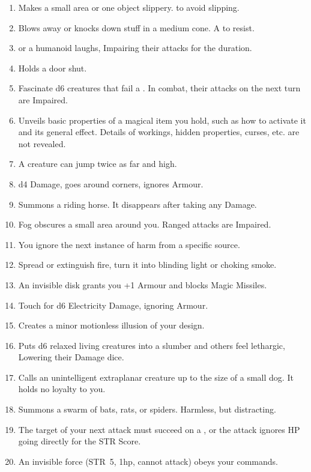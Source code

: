 \documentclass[itdr/core]{subfiles}
\begin{document}
\begin{enumerate}
	\vfill
	\break
	
	\item {} Makes a small area or one object slippery.  to avoid slipping.
	\item {} Blows away or knocks down stuff in a medium cone. A  to resist.
	\item {}  or a humanoid laughs, Impairing their attacks for the duration.
	\item {} Holds a door shut.
	\item {} Fascinate d6 creatures that fail a . In combat, their attacks on the next turn are Impaired.
	\item {} Unveils basic properties of a magical item you hold, such as how to activate it and its general effect. Details of workings, hidden properties, curses, etc. are not revealed.
	\item {} A creature can jump twice as far and high.
	\item {} d4 Damage, goes around corners, ignores Armour.
	\item {} Summons a riding horse. It disappears after taking any Damage.
	\item {} Fog obscures a small area around you. Ranged attacks are Impaired.
	\item {} You ignore the next instance of harm from a specific source.
	\item {} Spread or extinguish fire, turn it into blinding light or choking smoke.
	\item {} An invisible disk grants you +1 Armour and blocks Magic Missiles.
	\item {} Touch for d6 Electricity \mbox{Damage}, ignoring Armour.
	\item {} Creates a minor motionless \mbox{illusion} of your design.
	\item {} Puts d6 relaxed living creatures into a slumber and others feel lethargic, Lowering their \mbox{Damage} dice.
	\item {} Calls an unintelligent extraplanar creature up to the size of a small dog. It holds no loyalty to you.
	\item {} Summons a swarm of bats, rats, or spiders. Harmless, but distracting.
	\item {} The target of your next attack must succeed on a , or the attack ignores HP going directly for the STR Score.
	\item {} An invisible force (STR~5, 1hp, cannot attack) obeys your commands.
\end{enumerate}
\end{document}

